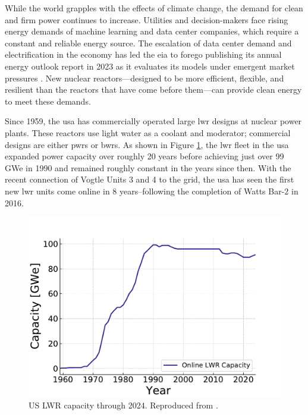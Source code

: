 While the world grapples with the effects of climate change, the demand for clean and firm power continues to increase. Utilities and decision-makers face rising energy demands of machine learning and data center companies, which require a constant and reliable energy source. The escalation of data center demand and electrification in the economy has led the \gls{eia} to forego publishing its annual energy outlook report in 2023 as it evaluates its models under emergent market pressures \cite{eia_annual_outlook_canceled_2023}. New nuclear reactors---designed to be more efficient, flexible, and resilient than the reactors that have come before them---can provide clean energy to meet these demands.

Since 1959, the \gls{usa} has commercially operated large \gls{lwr} designs at
nuclear power plants. These reactors use light water as a coolant and moderator;
commercial designs are either \glspl{pwr} or \glspl{bwr}. As shown in Figure
\ref{fig:online_lwr_cap_2024}, the \gls{lwr} fleet in the \gls{usa} expanded power capacity over roughly 20 years before achieving just over 99 GWe in
1990 and remained roughly constant in the years since then. With the recent
connection of Vogtle Units 3 and 4 to the grid, the \gls{usa} has seen the
first new \gls{lwr} units come online in 8 years--following the completion of
Watts Bar-2 in 2016.

\begin{figure}[H]
    \centering
    \includegraphics[scale=0.7]{images/intro/online_lwr_cap_2024.pdf}
    \caption{US LWR capacity through 2024. Reproduced from \cite{IAEA_PRIS}.}
    \label{fig:online_lwr_cap_2024}
\end{figure}

